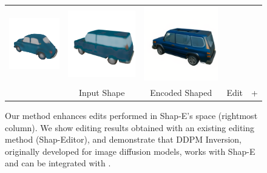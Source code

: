 \begin{figure}
{\begin{tabular}{ccccc}
            \includegraphics[width=0.22\linewidth, trim=30 60 15 85, clip]{images/editings/ddpm_inv/shap_e/original_shap_e_tile_0.png} &
           \includegraphics[width=0.22\linewidth, trim=30 60 0 85, clip]{images/editings/ddpm_inv/edit2_shap_e/mv_0_image_tile_0.png} &
               \includegraphics[width=0.22\linewidth, trim=30 60 0 85, clip]{images/editings/ddpm_inv/edit2_sharp_e/blue_suv_75_steps_batch_0_a_metalic_blue_suv_tile_0.png} \\
        & Input Shape & Encoded Shaped & Edit & + \ourname{}
    \end{tabular}
    }
    \vspace{-4pt}
    \caption{
    Our method enhances edits performed in Shap-E's space (rightmost column). We show editing results obtained with an existing editing method (Shap-Editor), and demonstrate that DDPM Inversion, originally developed for image diffusion models, works with Shap-E and can be integrated with \ourname{}.
    }
    \vspace{-16pt}
    \label{fig:edits}
\end{figure}